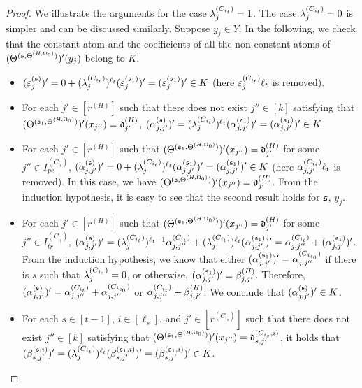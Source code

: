 \begin{appendix}
\begin{proof}
We illustrate the arguments for the case $\lambda^{(C_{i_t})}_{j} = 1$. The case $\lambda^{(C_{i_t})}_{j} = 0$ is simpler and can be discussed similarly. Suppose $y_j \in Y$.  In the following, we check that the constant atom and the coefficients of all the non-constant atoms of $(\Theta^{({\mathfrak{s} },\Theta^{(H,\Omega_0)})})'(y_j)$ belong to $K$.  
\begin{itemize}
\item $(\varepsilon^{({\mathfrak{s} })}_{j})' = 0 + (\lambda^{(C_{i_t})}_{j})^{\ell_t} (\varepsilon^{({\mathfrak{s} }_1)}_j)' = (\varepsilon^{({\mathfrak{s} }_1)}_j)' \in K$ (here $\varepsilon^{(C_{i_t})}_{j} \ell_t$ is removed).
%
%
\item For each $j' \in [r^{(H)}]$ such that there does not exist $j'' \in [k]$ satisfying that $(\Theta^{({\mathfrak{s} }_1,\Theta^{(H,\Omega_0)})})'(x_{j''})=\mathfrak{d}^{(H)}_{j'}$, $(\alpha^{({\mathfrak{s} })}_{j, j'})' = (\lambda^{(C_{i_t})}_{j})^{\ell_t} (\alpha^{({\mathfrak{s} }_1)}_{j, j'})' = (\alpha^{({\mathfrak{s} }_1)}_{j, j'})' \in K$.
%
\item For each $j' \in [r^{(H)}]$ such that $(\Theta^{({\mathfrak{s} }_1,\Theta^{(H,\Omega_0)})})'(x_{j''})=\mathfrak{d}^{(H)}_{j'}$ for some $j''  \in I^{(C_{i_t})}_{pe}$, $(\alpha^{({\mathfrak{s} })}_{j, j'})' = 0 + (\lambda^{(C_{i_t})}_{j})^{\ell_t} (\alpha^{({\mathfrak{s} }_1)}_{j, j'})'= (\alpha^{({\mathfrak{s} }_1)}_{j, j'})' \in K$ (here $\alpha^{(C_{i_t})}_{j,j'} \ell_t$ is removed). In this case, we have $(\Theta^{({\mathfrak{s} },\Theta^{(H,\Omega_0)})})'(x_{j''})=\mathfrak{d}^{(H)}_{j'}$. From the induction hypothesis, it is easy to see that the second result holds for ${\mathfrak{s} }$, $y_j$.
%
\item For each $j' \in [r^{(H)}]$ such that $(\Theta^{({\mathfrak{s} }_1,\Theta^{(H,\Omega_0)})})'(x_{j''})=\mathfrak{d}^{(H)}_{j'}$ for some $j''  \in I^{(C_{i_t})}_{tr}$, $(\alpha^{({\mathfrak{s} })}_{j, j'})' =(\lambda^{(C_{i_t})}_{j})^{\ell_t-1} \alpha^{(C_{i_t})}_{j,j''} + (\lambda^{(C_{i_t})}_{j})^{\ell_t} (\alpha^{({\mathfrak{s} }_1)}_{j, j'})' = \alpha^{(C_{i_t})}_{j,j''} + (\alpha^{({\mathfrak{s} }_1)}_{j, j'})' $. From the induction hypothesis, we know that either $(\alpha^{({\mathfrak{s} }_1)}_{j, j'})' = \alpha^{(C_{i_{s_0}})}_{j,j''}$ if there is $s$ such that $\lambda^{(C_{i_s})}_j =0$,  or otherwise, $(\alpha^{({\mathfrak{s} }_1)}_{j, j'})'=\beta^{(H)}_{j, j'}$. Therefore, $(\alpha^{({\mathfrak{s} })}_{j, j'})' =\alpha^{(C_{i_t})}_{j,j''} +  \alpha^{(C_{i_{s_0}})}_{j,j''}$ or $\alpha^{(C_{i_t})}_{j,j''}+ \beta^{(H)}_{j, j'}$. We conclude that $(\alpha^{({\mathfrak{s} })}_{j, j'})' \in K$.
%
\item For each $s \in [t-1]$, $i \in [\ell_s]$, and $j' \in [r^{(C_{i_s})}]$ such that there does not exist $j'' \in [k]$ satisfying that $(\Theta^{({\mathfrak{s} }_1,\Theta^{(H,\Omega_0)})})'(x_{j''}) = \mathfrak{d}^{(C_{i_s}, i)}_{s, j'}$, it holds that $(\beta^{({\mathfrak{s} },i)}_{s,j'})' = (\lambda^{(C_{i_t})}_{j})^{\ell_t}  (\beta^{({\mathfrak{s} }_1, i)}_{s, j'})'  =  (\beta^{({\mathfrak{s} }_1, i)}_{s, j'})'  \in K$. 

\end{itemize}
\end{proof}
\end{appendix}
